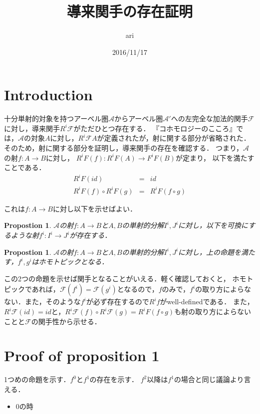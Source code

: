 \documentclass{ujarticle}
\title{導来関手の存在証明}
\author{ari}
\date{2016/11/17}
\newtheorem{prop}[thm]{Propostion}
\begin{document}
  \tableofcontents
\section{Introduction}
十分単射的対象を持つアーベル圏$\mathcal{A}$からアーベル圏$\mathcal{A}'$への左完全な加法的関手$\mathcal{F}$に対し，導来関手$R^i \mathcal{F}$がただひとつ存在する．
『コホモロジーのこころ』では，$\mathcal{A}$の対象$A$に対し，$R^i \mathcal{F}A$が定義されたが，射に関する部分が省略された．
そのため，射に関する部分を証明し，導来関手の存在を確認する．
つまり，$\mathcal{A}$の射$f:A \to B$に対し，
$R^iF(f):R^iF(A) \to F^iF(B)$が定まり，
以下を満たすことである．
\begin{eqnarray}
  R^iF(id) & = & id \\
  R^iF(f) \circ R^iF(g) &=& R^iF(f \circ g)
\end{eqnarray}

これは$f:A \to B$に対し以下を示せばよい．

\begin{prop}
 $\mathcal{A}$の射$f:A \to B$と$A,B$の単射的分解$I^i,J^i$に対し，以下を可換にするような射$f^i:I^i \to J^i$が存在する．

\end{prop}

\begin{prop}
  $\mathcal{A}$の射$f:A \to B$と$A,B$の単射的分解$I^i,J^i$に対し，上の命題を満たす，$f^i,g^i$はホモトピックとなる．
\end{prop}
この2つの命題を示せば関手となることがいえる．軽く確認しておくと，
ホモトピックであれば，$\mathcal{F}(f^i)=\mathcal{F}(g^i)$となるので，$f$のみで，$f^i$の取り方によらなない．また，そのような$f^i$が必ず存在するので$R^if$がwell-definedである．
また，$R^i \mathcal{F}(id)=id $と，$R^i\mathcal{F}(f) \circ R^i \mathcal{F}(g) = R^iF(f \circ g)$も射の取り方によらないことと$\mathcal{F}$の関手性から示せる．

\section{Proof of proposition 1}
\label{sec:Proof of proposition 1}
1つめの命題を示す．$f^0$と$f^1$の存在を示す．
$f^2$以降は$f^1$の場合と同じ議論より言える．
\begin{itemize}
  \item 0の時
\end{itemize}
\end{document}
